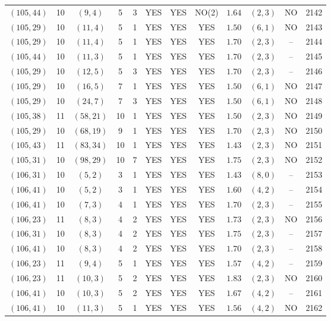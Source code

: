 \begin{longtable}{|c|c|c|c|c|c|c|c|c|c|c|c|}
$(105,44)$ & 10 & $(9,4)$ & 5 & 3 & YES & YES & NO(2) & $1.64$ & $(2,3)$ & NO & 2142\\
$(105,29)$ & 10 & $(11,4)$ & 5 & 1 & YES & YES & YES & $1.50$ & $(6,1)$ & NO & 2143\\
$(105,29)$ & 10 & $(11,4)$ & 5 & 1 & YES & YES & YES & $1.70$ & $(2,3)$ & -- & 2144\\
$(105,44)$ & 10 & $(11,3)$ & 5 & 1 & YES & YES & YES & $1.70$ & $(2,3)$ & -- & 2145\\
$(105,29)$ & 10 & $(12,5)$ & 5 & 3 & YES & YES & YES & $1.70$ & $(2,3)$ & -- & 2146\\
$(105,29)$ & 10 & $(16,5)$ & 7 & 1 & YES & YES & YES & $1.50$ & $(6,1)$ & NO & 2147\\
$(105,29)$ & 10 & $(24,7)$ & 7 & 3 & YES & YES & YES & $1.50$ & $(6,1)$ & NO & 2148\\
$(105,38)$ & 11 & $(58,21)$ & 10 & 1 & YES & YES & YES & $1.50$ & $(2,3)$ & NO & 2149\\
$(105,29)$ & 10 & $(68,19)$ & 9 & 1 & YES & YES & YES & $1.70$ & $(2,3)$ & NO & 2150\\
$(105,43)$ & 11 & $(83,34)$ & 10 & 1 & YES & YES & YES & $1.43$ & $(2,3)$ & NO & 2151\\
$(105,31)$ & 10 & $(98,29)$ & 10 & 7 & YES & YES & YES & $1.75$ & $(2,3)$ & NO & 2152\\
$(106,31)$ & 10 & $(5,2)$ & 3 & 1 & YES & YES & YES & $1.43$ & $(8,0)$ & -- & 2153\\
$(106,41)$ & 10 & $(5,2)$ & 3 & 1 & YES & YES & YES & $1.60$ & $(4,2)$ & -- & 2154\\
$(106,41)$ & 10 & $(7,3)$ & 4 & 1 & YES & YES & YES & $1.70$ & $(2,3)$ & -- & 2155\\
$(106,23)$ & 11 & $(8,3)$ & 4 & 2 & YES & YES & YES & $1.73$ & $(2,3)$ & NO & 2156\\
$(106,31)$ & 10 & $(8,3)$ & 4 & 2 & YES & YES & YES & $1.75$ & $(2,3)$ & -- & 2157\\
$(106,41)$ & 10 & $(8,3)$ & 4 & 2 & YES & YES & YES & $1.70$ & $(2,3)$ & -- & 2158\\
$(106,23)$ & 11 & $(9,4)$ & 5 & 1 & YES & YES & YES & $1.57$ & $(4,2)$ & -- & 2159\\
$(106,23)$ & 11 & $(10,3)$ & 5 & 2 & YES & YES & YES & $1.83$ & $(2,3)$ & NO & 2160\\
$(106,41)$ & 10 & $(10,3)$ & 5 & 2 & YES & YES & YES & $1.67$ & $(4,2)$ & -- & 2161\\
$(106,41)$ & 10 & $(11,3)$ & 5 & 1 & YES & YES & YES & $1.56$ & $(4,2)$ & NO & 2162\\

\end{longtable}
